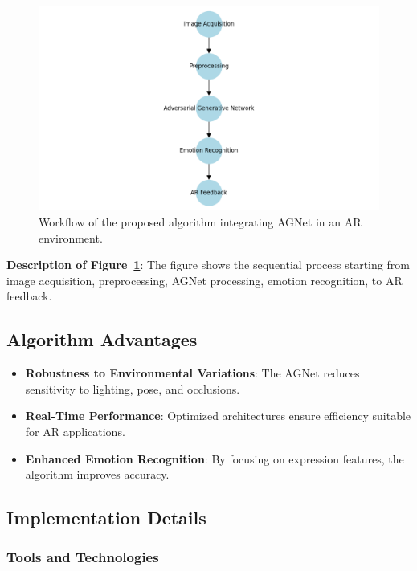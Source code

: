 \documentclass[lettersize,journal]{IEEEtran}
\begin{document}
\begin{figure}[htbp]
\centering
\includegraphics[width=0.9\linewidth]{System_Workflow.png}
\caption{Workflow of the proposed algorithm integrating AGNet in an AR environment.}
\label{fig:system_workflow}
\end{figure}

\textbf{Description of Figure~\ref{fig:system_workflow}}: The figure shows the sequential process starting from image acquisition, preprocessing, AGNet processing, emotion recognition, to AR feedback.

\subsection{Algorithm Advantages}

\begin{itemize}
\item \textbf{Robustness to Environmental Variations}: The AGNet reduces sensitivity to lighting, pose, and occlusions.
\item \textbf{Real-Time Performance}: Optimized architectures ensure efficiency suitable for AR applications.
\item \textbf{Enhanced Emotion Recognition}: By focusing on expression features, the algorithm improves accuracy.
\end{itemize}

\subsection{Implementation Details}

\subsubsection{Tools and Technologies}
\end{document}
